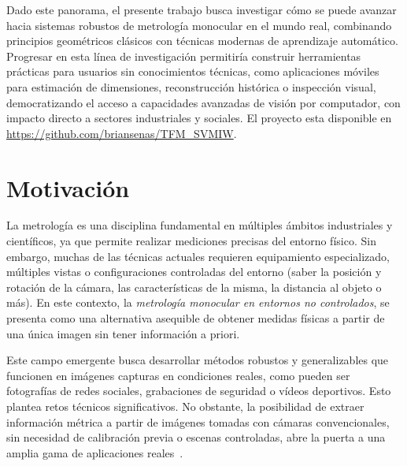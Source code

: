 Dado este panorama, el presente trabajo busca investigar cómo se puede avanzar hacia sistemas robustos de metrología monocular en el mundo real, 
combinando principios geométricos clásicos con técnicas modernas de aprendizaje automático. Progresar en esta línea de investigación 
permitiría construir herramientas prácticas para usuarios sin conocimientos técnicas, como aplicaciones móviles para 
estimación de dimensiones, reconstrucción histórica o inspección visual, democratizando el acceso a capacidades avanzadas 
de visión por computador, con impacto directo a sectores industriales y sociales.
El proyecto esta disponible en \url{https://github.com/briansenas/TFM_SVMIW}.

\section{Motivación}
La metrología es una disciplina fundamental en múltiples ámbitos industriales y científicos, ya que permite realizar mediciones precisas del entorno físico. 
Sin embargo, muchas de las técnicas actuales requieren equipamiento especializado, múltiples vistas o configuraciones controladas del entorno (saber la posición y rotación de la cámara, las características de la misma, la distancia al objeto o más).
En este contexto, la \emph{metrología monocular en entornos no controlados}, se presenta como una alternativa asequible de obtener medidas físicas a partir de una única imagen
sin tener información a priori.
\par
Este campo emergente busca desarrollar métodos robustos y generalizables que funcionen en imágenes capturas en condiciones reales, como pueden ser 
fotografías de redes sociales, grabaciones de seguridad o vídeos deportivos. Esto plantea retos técnicos significativos.
No obstante, la posibilidad de extraer información métrica a partir de imágenes tomadas con cámaras convencionales, sin necesidad de calibración previa o escenas controladas, 
abre la puerta a una amplia gama de aplicaciones reales~\cite{HoiemPopUp,HoiemObjectsInPerspective,CriminisiApplications, CriminisiReconstruction, CriminisiPaintings, SingleViewExerciseQuantification, ObjectsIntoPhotos}. 
